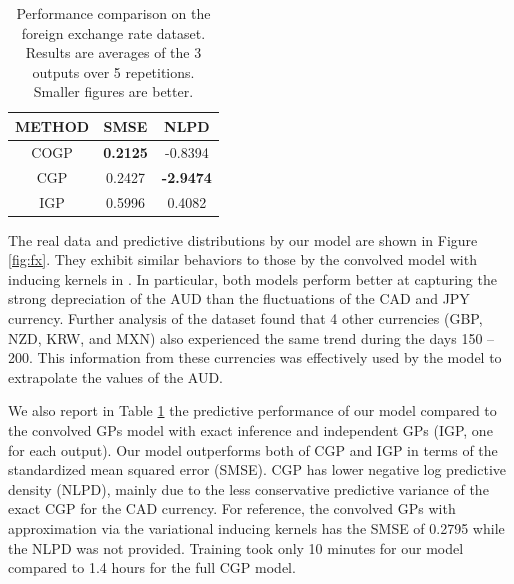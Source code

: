 \setlength{\tabcolsep}{4pt}
\begin{table}[t]
\caption{Performance comparison on the foreign exchange rate dataset. Results are averages of the 3 outputs over 5 repetitions. Smaller figures are better.}
\label{tab:fx}
\begin{center}
\begin{tabular}{ccc}
\toprule
\textbf{METHOD} & \textbf{SMSE} & \textbf{NLPD} \\ \hline
COGP  & \textbf{0.2125} & -0.8394 \\
CGP & 0.2427 & \textbf{-2.9474} \\
IGP & 0.5996 & 0.4082 \\
\bottomrule
\end{tabular}
\end{center}
\end{table}

The real data and predictive distributions by our model are shown in Figure \ref{fig:fx}.
They exhibit similar behaviors to those by the convolved model with inducing kernels in \citet{alvarez2010efficient}.
In particular, both models perform better at capturing the strong depreciation of the AUD than the fluctuations of the CAD and JPY currency.
Further analysis of the dataset found that 4 other currencies (GBP, NZD, KRW, and MXN) also experienced the same trend during the days 
150 -- 200.
This information from these currencies was effectively used by the model to extrapolate the values of the AUD.

We also report in Table \ref{tab:fx} the predictive performance of our model compared to the convolved GPs model with exact inference \citep[CGP,][]{alvarez-lawrence-nips-08} and independent GPs (IGP, one for each output).
Our model outperforms both of CGP and IGP in terms of the standardized mean squared error (SMSE).
CGP has lower negative log predictive density (NLPD), mainly due to the less conservative predictive variance of the exact CGP for the CAD currency.
For reference, the convolved GPs with approximation via the variational inducing kernels  \citep[CGPVAR,][]{alvarez2010efficient} has the SMSE of 0.2795 while the NLPD was not provided.
Training took only 10 minutes for our model compared to 1.4 hours for the full CGP model.

